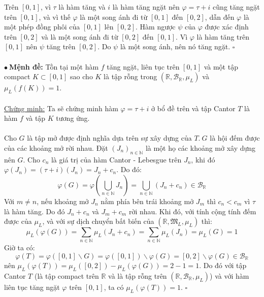 \documentclass[10.5pt, a4paper]{article}
\begin{document}
Trên $[0,1]$, vì $\tau$ là hàm tăng và $i$ là hàm tăng ngặt nên $\varphi=\tau+i$ cũng tăng ngặt trên $[0,1]$, và vì thế $\varphi$ là một song ánh đi từ $[0,1]$ đến $[0,2]$, dẫn đến $\varphi$ là một phép đồng phôi của $[0,1]$ lên $[0,2]$. Hàm ngược $\psi$ của $\varphi$ được xác định trên $[0,2]$ và là một song ánh đi từ $[0,2]$ đến $[0,1]$. Vì $\varphi$ là hàm tăng trên $[0,1]$ nên $\psi$ tăng trên $[0,2]$. Do $\psi$ là một song ánh, nên nó tăng ngặt. $\square$\\\\
$\bullet~$\textbf{Mệnh đề:} Tồn tại một hàm $f$ tăng ngặt, liên tục trên $[0,1]$ và một tập compact $K\subset[0,1]$ sao cho $K$ là tập rỗng trong $(\mathbb R,\mathcal B_{\mathbb R},\mu_L)$ và $\mu_L(f(K))=1$.\\\\
\underline{Chứng minh:} Ta sẽ chứng minh hàm $\varphi=\tau+i$ ở bổ đề trên và tập Cantor $T$ là hàm $f$ và tập $K$ tương ứng.\\\\
Cho $G$ là tập mở được định nghĩa dựa trên sự xây dựng của $T.~G$ là hội đếm được của các khoảng mở rời nhau. Đặt $(J_n)_{n\in\mathbb N}$ là một họ các khoảng mở xây dựng nên $G$. Cho $c_n$ là giá trị của hàm Cantor - Lebesgue trên $J_n$, khi đó $\varphi(J_n)=(\tau+i)(J_n)=J_n+c_n$. Do đó: $$\varphi(G)=\varphi\left(\displaystyle\bigcup_{n\in\mathbb N}J_n\right)=\displaystyle\bigcup_{n\in\mathbb N}(J_n+c_n)\in\mathcal B_{\mathbb R}$$
Với $m\ne n$, nếu khoảng mở $J_n$ nằm phía bên trái khoảng mở $J_m$ thì $c_n<c_m$ vì $\tau$ là hàm tăng. Do đó $J_n+c_n$ và $J_m+c_m$ rời nhau. Khi đó, với tính cộng tính đếm được của $\mu_L$, và với sự dịch chuyển bất biến của $(\mathbb R,\mathfrak M_L,\mu_L)$ thì: $$\mu_L(\varphi(G))=\displaystyle\sum_{n\in\mathbb N}\mu_L(J_n+c_n)=\displaystyle\sum_{n\in\mathbb N}\mu_L(J_n)=\mu_L(G)=1$$
Giờ ta có: $$\varphi(T)=\varphi([0,1]\backslash G)=\varphi([0,1])\backslash\varphi(G)=[0,2]\backslash\varphi(G)\in\mathcal B_{\mathbb R}$$
nên $\mu_L(\varphi(T))=\mu_L([0,2])-\mu_L(\varphi(G))=2-1=1$. Do đó với tập Cantor $T$ (là tập compact trên $\mathbb R$ và là tập rỗng trên $(\mathbb R,\mathcal B_{\mathbb R},\mu_L)$) và với hàm liên tục tăng ngặt $\varphi$ trên $[0,1]$, ta có $\mu_L(\varphi(T))=1$. $\square$
\end{document}
